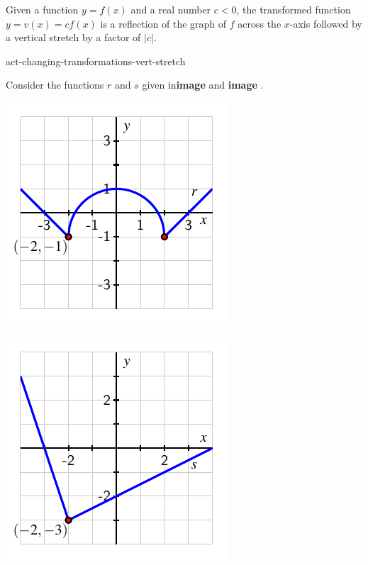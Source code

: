 \documentclass{ximera}
\begin{document}
Given a function \(y = f(x)\) and a real number \(c \lt 0\), the transformed function \(y = v(x) = cf(x)\) is a reflection of the graph of \(f\) across the \(x\)-axis followed by a vertical stretch by a factor of \(|c|\).%

\begin{exploration}{}{act-changing-transformations-vert-stretch}%

Consider the functions \(r\) and \(s\) given in\textbf{image}  and \textbf{image} .%
\begin{image}
\includegraphics[width=1\linewidth]{images/transformations-act-r-translation}

\includegraphics[width=1\linewidth]{images/transformations-act-s-translation}
\end{image}


\end{exploration}
\end{document}
